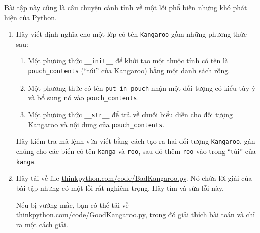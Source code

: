 \documentclass[11pt]{book}
\begin{document}
\begin{ex}


Bài tập này cũng là câu chuyện cảnh tỉnh về một lỗi phổ biến nhưng
khó phát hiện của Python.

\begin{enumerate}


\item Hãy viết định nghĩa cho một lớp có tên  {\tt Kangaroo} gồm những
phương thức sau:

\begin{enumerate}

\item Một phương thức \verb"__init__" để khởi tạo một thuộc tính có tên là 
\verb"pouch_contents" (``túi'' của Kangaroo)  bằng một danh sách rỗng.

\item Một phương thức có tên \verb"put_in_pouch" nhận một đối tượng có kiểu
tùy ý và bổ sung nó vào  \verb"pouch_contents".

\item Một phương thức \verb"__str__" để trả về chuỗi biểu diễn
cho đối tượng Kangaroo và nội dung của \verb"pouch_contents".

\end{enumerate}
%
Hãy kiểm tra mã lệnh vừa viết bằng cách 
tạo ra hai đối tượng {\tt Kangaroo}, gán chúng cho các biến
có tên {\tt kanga} và {\tt roo}, sau đó thêm {\tt roo} vào 
trong ``túi'' của {\tt kanga}.

\item Hãy tải về file \url{thinkpython.com/code/BadKangaroo.py}.  Nó chứa 
lời giải của bài tập nhưng có một lỗi rất nghiêm trọng. Hãy tìm và sửa lỗi này.

Nếu bị vướng mắc, bạn có thể tải về 
\url{thinkpython.com/code/GoodKangaroo.py}, trong đó giải thích bài toán
và chỉ ra một cách giải.


\end{enumerate}


\end{ex}
\end{document}
